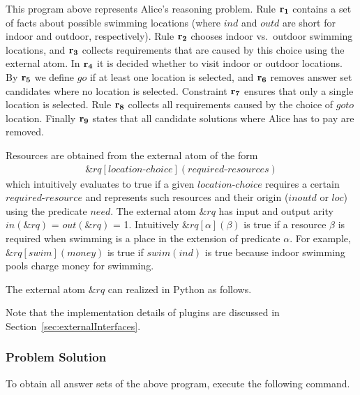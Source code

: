 \documentclass[a4paper, titlepage]{article}
\newcommand{\ext}[3]{\ensuremath{\&{\mathit{#1}}[#2](#3)}}
\newcommand{\row}[1]{%
  \ensuremath{\color{black}\ensuremath{\mathbf{#1}} \color{black}}%
}
\begin{document}
This program above represents Alice's reasoning 
problem. Rule $\row{r_1}$ contains a set of facts about possible 
swimming locations (where $\mathit{ind}$ and 
$\mathit{outd}$ are short for indoor and outdoor, 
respectively). Rule $\row{r_2}$ chooses indoor vs.\ outdoor 
swimming locations, and $\row{r_3}$ collects requirements that 
are caused by this choice using the external atom. 
%
In $\row{r_4}$ it is decided whether to visit indoor or outdoor locations.
By $\row{r_5}$ we define $go$ if at least one location is selected,
and $\row{r_6}$ removes answer set candidates where no location is selected.
Constraint $\row{r_7}$ ensures that only a single location is selected.
Rule $\row{r_8}$ collects all requirements caused by 
the choice of $\mathit{goto}$ location.
Finally $\row{r_9}$ states that all candidate solutions where 
Alice has to pay are removed.

Resources are obtained from the external atom of the form
\begin{align*}
  \ext{\mathit{rq}}{\mathit{location}\text{-}\mathit{choice}}%
  {\mathit{required}\text{-}\mathit{resources}}
\end{align*}
which intuitively 
evaluates to true if a given $\mathit{location}$-$\mathit{choice}$ 
requires a certain $\mathit{required}$-$\mathit{resource}$ and 
represents such resources  and their origin 
($\mathit{inoutd}$ or $\mathit{loc}$) using the predicate 
$\mathit{need}$. The external atom $\mathit{\&rq}$ has 
input and output arity $\mathit{in(\&rq)}$ = 
$\mathit{out(\&rq)}$ = 1. Intuitively  $\ext{\mathit{rq}}
{\mathit{\alpha}}{\mathit{\beta}}$ is true if a resource 
$\beta$ is required when swimming is a place in the 
extension of predicate $\alpha$. For example, 
$\ext{\mathit{rq}}{\mathit{swim}}{\mathit{money}}$ is true 
if $\mathit{swim(ind)}$ is true because indoor swimming 
pools charge money for swimming. 


The external atom $\&rq$ can realized in Python as follows.



Note that the implementation details of plugins
are discussed in Section~\ref{sec:externalInterfaces}.

\subsubsection{Problem Solution}

To obtain all answer sets of the above program,
execute the following command.
\end{document}
